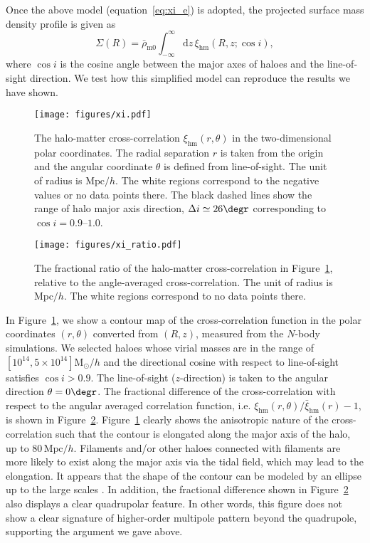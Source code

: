 \documentclass[a4paper,fleqn,usenatbib]{mnras}
\newcommand{\beq}{\begin{equation}}
\newcommand{\eeq}{\end{equation}}
\newcommand{\Mpc}{\mathrm{Mpc}}
\newcommand{\Msun}{\mathrm{M}_\odot}
\newcommand{\rmhm}{\mathrm{hm}}
\begin{document}
Once the above model (equation~\ref{eq:xi_e}) is adopted,
the projected surface mass density profile is given as
\beq
\Sigma (R) = \bar{\rho}_\mathrm{m0}
\int_{-\infty}^\infty\!\! \mathrm{d}z \, \xi_\rmhm (R, z; \cos i),
\eeq
where $\cos i$ is the cosine angle between the major axes of haloes and
the line-of-sight direction.
We test how this simplified model can reproduce the results we have shown.

\begin{figure}
\texttt{[image: figures/xi.pdf]}
\caption{The halo-matter cross-correlation $\xi_\rmhm (r, \theta)$
in the two-dimensional polar coordinates.
The radial separation $r$ is taken from the origin and the angular coordinate $\theta$
is defined from line-of-sight. The unit of radius is $\Mpc/h$.
The white regions correspond to the negative values or no data points there.
The black dashed lines show the range of halo major axis direction,
$\Delta i \simeq 26 \degr$ corresponding to $\cos i = 0.9$--$1.0$.}
\label{fig:xi}
\end{figure}

\begin{figure}
\texttt{[image: figures/xi\_ratio.pdf]}
\caption{The fractional ratio of the halo-matter cross-correlation
in Figure~\ref{fig:xi}, relative to the angle-averaged cross-correlation.
The unit of radius is $\Mpc/h$.
The white regions correspond to no data points there.}
\label{fig:xi_ratio}
\end{figure}

In Figure~\ref{fig:xi},
we show a contour map of the cross-correlation function
in the polar coordinates $(r, \theta)$ converted from $(R, z)$,
measured from the $N$-body simulations.
We selected haloes whose virial masses are in the range of
$[10^{14}, 5 \times 10^{14}] \Msun /h$ and the directional cosine with respect
to line-of-sight satisfies $\cos i > 0.9$.
The line-of-sight ($z$-direction) is taken to the angular direction $\theta = 0 \degr$.
The fractional difference of the cross-correlation
with respect to the angular averaged correlation function, i.e.
$\xi_\rmhm (r, \theta)/\bar{\xi}_\rmhm (r) - 1$, is shown in Figure~\ref{fig:xi_ratio}.
Figure~\ref{fig:xi} clearly shows the anisotropic nature of the
cross-correlation such that the contour is elongated along the major
axis of the halo, up to $80\,\Mpc/h$.
Filaments and/or other haloes connected with filaments
are more likely to exist along the major axis via the tidal field,
which may lead to the elongation.
It appears that the shape of the contour can be
modeled by an ellipse up to the large scales
\citep[see also][]{Schneider2012}. In addition, the fractional difference shown
in Figure~\ref{fig:xi_ratio} also displays a clear quadrupolar feature.
In other words, this figure does not show a clear signature of higher-order
multipole pattern beyond the quadrupole, supporting the argument we gave above.
\end{document}
